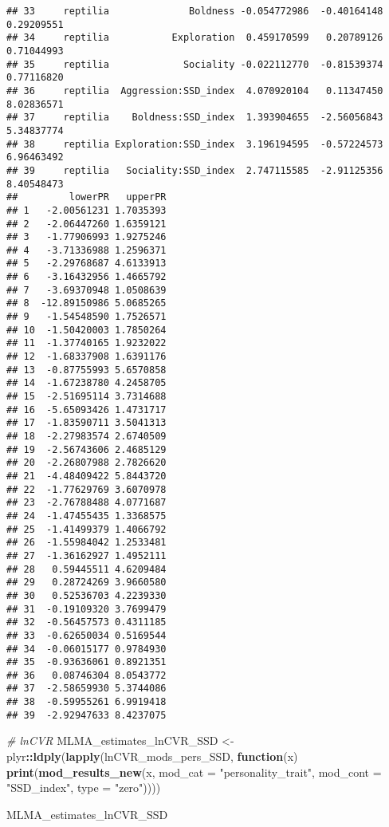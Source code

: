 \documentclass[]{article}
\newenvironment{Shaded}{\begin{snugshade}}{\end{snugshade}}
\newcommand{\KeywordTok}[1]{\textcolor[rgb]{0.13,0.29,0.53}{\textbf{#1}}}
\newcommand{\DataTypeTok}[1]{\textcolor[rgb]{0.13,0.29,0.53}{#1}}
\newcommand{\StringTok}[1]{\textcolor[rgb]{0.31,0.60,0.02}{#1}}
\newcommand{\CommentTok}[1]{\textcolor[rgb]{0.56,0.35,0.01}{\textit{#1}}}
\newcommand{\ControlFlowTok}[1]{\textcolor[rgb]{0.13,0.29,0.53}{\textbf{#1}}}
\newcommand{\OperatorTok}[1]{\textcolor[rgb]{0.81,0.36,0.00}{\textbf{#1}}}
\newcommand{\NormalTok}[1]{#1}
\begin{document}
\begin{verbatim}
## 33     reptilia              Boldness -0.054772986  -0.40164148 0.29209551
## 34     reptilia           Exploration  0.459170599   0.20789126 0.71044993
## 35     reptilia             Sociality -0.022112770  -0.81539374 0.77116820
## 36     reptilia  Aggression:SSD_index  4.070920104   0.11347450 8.02836571
## 37     reptilia    Boldness:SSD_index  1.393904655  -2.56056843 5.34837774
## 38     reptilia Exploration:SSD_index  3.196194595  -0.57224573 6.96463492
## 39     reptilia   Sociality:SSD_index  2.747115585  -2.91125356 8.40548473
##         lowerPR   upperPR
## 1   -2.00561231 1.7035393
## 2   -2.06447260 1.6359121
## 3   -1.77906993 1.9275246
## 4   -3.71336988 1.2596371
## 5   -2.29768687 4.6133913
## 6   -3.16432956 1.4665792
## 7   -3.69370948 1.0508639
## 8  -12.89150986 5.0685265
## 9   -1.54548590 1.7526571
## 10  -1.50420003 1.7850264
## 11  -1.37740165 1.9232022
## 12  -1.68337908 1.6391176
## 13  -0.87755993 5.6570858
## 14  -1.67238780 4.2458705
## 15  -2.51695114 3.7314688
## 16  -5.65093426 1.4731717
## 17  -1.83590711 3.5041313
## 18  -2.27983574 2.6740509
## 19  -2.56743606 2.4685129
## 20  -2.26807988 2.7826620
## 21  -4.48409422 5.8443720
## 22  -1.77629769 3.6070978
## 23  -2.76788488 4.0771687
## 24  -1.47455435 1.3368575
## 25  -1.41499379 1.4066792
## 26  -1.55984042 1.2533481
## 27  -1.36162927 1.4952111
## 28   0.59445511 4.6209484
## 29   0.28724269 3.9660580
## 30   0.52536703 4.2239330
## 31  -0.19109320 3.7699479
## 32  -0.56457573 0.4311185
## 33  -0.62650034 0.5169544
## 34  -0.06015177 0.9784930
## 35  -0.93636061 0.8921351
## 36   0.08746304 8.0543772
## 37  -2.58659930 5.3744086
## 38  -0.59955261 6.9919418
## 39  -2.92947633 8.4237075
\end{verbatim}

\begin{Shaded}
\begin{Highlighting}[]
    \CommentTok{# lnCVR}
\NormalTok{  MLMA_estimates_lnCVR_SSD <-}\StringTok{ }\NormalTok{plyr}\OperatorTok{::}\KeywordTok{ldply}\NormalTok{(}\KeywordTok{lapply}\NormalTok{(lnCVR_mods_pers_SSD, }\ControlFlowTok{function}\NormalTok{(x) }
   \KeywordTok{print}\NormalTok{(}\KeywordTok{mod_results_new}\NormalTok{(x, }\DataTypeTok{mod_cat =} \StringTok{"personality_trait"}\NormalTok{, }\DataTypeTok{mod_cont =} \StringTok{"SSD_index"}\NormalTok{, }\DataTypeTok{type =} \StringTok{"zero"}\NormalTok{))))}
    
\NormalTok{    MLMA_estimates_lnCVR_SSD}
\end{Highlighting}
\end{Shaded}
\end{document}
